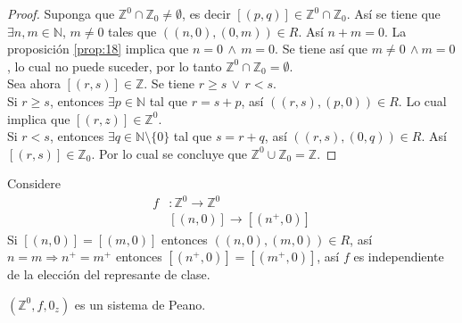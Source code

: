 \begin{proof}
  Suponga que $\mathbb{Z}^0 \cap \mathbb{Z}_0 \neq \emptyset$, es decir
  $[(p,q)] \in \mathbb{Z}^0 \cap \mathbb{Z}_0$. Así se tiene que $\exists n, m
  \in \mathbb{N}$, $m \neq 0$  tales que $((n,0),(0,m))\in R$. Así $n + m =
  0$. La proposición \ref{prop:18} implica que $n = 0 \, \land \, m = 0$. Se
  tiene así que $m \neq 0 \, \land m = 0$, lo cual no puede suceder, por lo
  tanto $\mathbb{Z}^0 \cap \mathbb{Z}_0 = \emptyset$. \\
  Sea ahora $[(r,s)] \in \mathbb{Z}$. Se tiene $r \geq s \, \lor \, r < s$.
  \\
  Si $r \geq s$, entonces $\exists p \in \mathbb{N}$ tal que $r = s + p$, así
  $((r,s), (p,0))\in R$. Lo cual implica que $[(r,z)] \in \mathbb{Z}^0$. \\
  Si $r < s$, entonces $\exists q \in \mathbb{N}\setminus \{0\}$ tal que $s =
  r + q$, así $((r,s),(0,q))\in R$. Así $[(r,s)] \in \mathbb{Z}_0$. Por lo
  cual se concluye que $\mathbb{Z}^0 \cup \mathbb{Z}_0 = \mathbb{Z}$.
\end{proof}
Considere 
\begin{align*}
  f&: \mathbb{Z}^0 \rightarrow \mathbb{Z}^0 \\
   & [(n,0)]\rightarrow [(n^+, 0)] 
\end{align*}
Si $[(n,0)]=[(m,0)]$ entonces $((n,0),(m,0))\in R$, así $n=m \Rightarrow n^+ =
m^+$ entonces $[(n^+,0)]= [(m^+,0)]$, así $f$ es independiente de la elección
del represante de clase.
\begin{proposition}\label{prop:33}
  $(\mathbb{Z}^0, f, 0_z)$ es un sistema de Peano.
\end{proposition}

